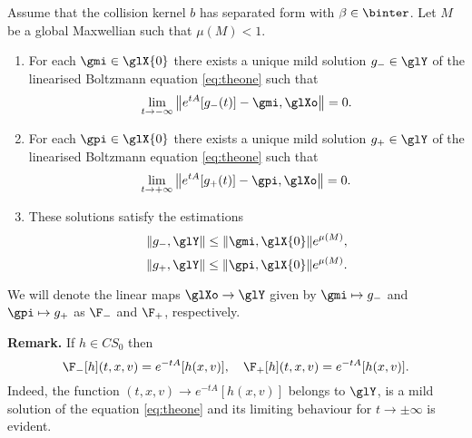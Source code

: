 \begin{theorem}
	\label{th:exists:boundary}
     Assume that the collision kernel $b$ has
separated form with $\beta\in \binter$. Let $M$ be a global Maxwellian such
that $\mu(M)<1$.     \begin{enumerate}     \item \label{eit:exists:boundary}
For each $\gmi\in \glX{0}$ there exists a unique mild solution $g_-\in \glY$
of the linearised Boltzmann equation \eqref{eq:theone} such that \[\lim_{t\to- \infty}\left\|e^{tA}[g_-(t)]-\gmi,\glXo\right\|=0.\]
	\item For each $\gpi\in \glX{0}$ there exists a unique mild solution $g_+\in \glY$
of the linearised Boltzmann equation \eqref{eq:theone} such that \[\lim_{t\to+ \infty}\left\|e^{tA}[g_+(t)]-\gpi,\glXo\right\|=0.\]
     \item  These
solutions satisfy the estimations \[\|g_-,\glY\|\le \|\gmi,\glX{0}\|e^{ \mu (M)}, \]
\[\|g_+,\glY\|\le \|\gpi,\glX{0}\|e^{ \mu (M)} .\]
	\end{enumerate}%
%
	We will denote the linear maps $\glXo\to \glY$ given by  $\gmi\mapsto g_-$
	 and $\gpi\mapsto g_+$ as
	  $\F_-$ and $\F_+$, respectively. 
\end{theorem}\noindent
\textbf{Remark.} If $h\in CS_0$ then
\[\F_{-}[h](t,x,v) = e^{-tA}[h(x,v)],\quad \F_{+}[h](t,x,v) = e^{-tA}[h(x,v)].\]
Indeed, the function $(t,x,v)\to e^{-tA}[h(x,v)]$ belongs to $\glY$, is a mild solution of the equation \eqref{eq:theone} and its limiting behaviour for $t\to\pm \infty	$ is evident.


